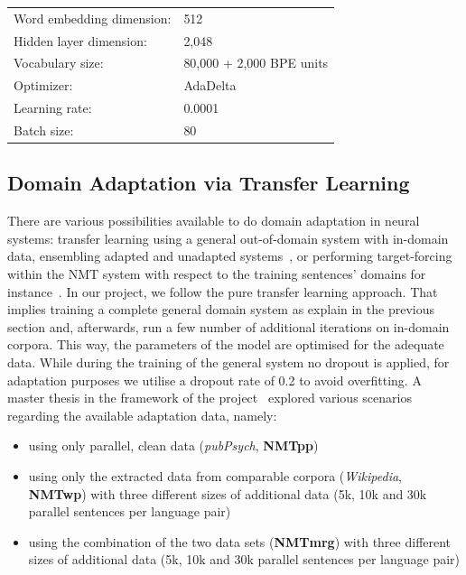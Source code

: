 \documentclass[a4paper,11pt]{article}
\begin{document}
\bigskip
\begin{tabular}{ll}
Word embedding dimension: & 512\\
Hidden layer dimension: & 2,048\\
Vocabulary size: & 80,000 + 2,000 BPE units\\
Optimizer: & AdaDelta\\
Learning rate: & 0.0001\\
Batch size: & 80\\
\end{tabular}



\subsection{Domain Adaptation via Transfer Learning}
\label{ss:adptNmt}

There are various possibilities available to do domain adaptation in neural systems: transfer learning using a general out-of-domain system with in-domain data, ensembling adapted and unadapted systems~\cite{freitag2016fast}, or performing target-forcing within the NMT system with respect to the training sentences' domains for instance~\cite{Chu2017AnEC}.
In our project, we follow the pure transfer learning approach. That implies training a complete general domain system as explain in the previous section and, afterwards, run a few number of additional iterations on in-domain corpora. This way, the parameters of the model are optimised for the adequate data. While during the training of the general system no dropout is applied, for adaptation purposes we utilise a dropout rate of 0.2 to avoid overfitting. 
A master thesis in the framework of the project~\cite{tesisAdam} explored various scenarios regarding the available adaptation data, namely: 

\begin{itemize}
\itemsep0.2em
	\item\label{i:pp} using only parallel, clean data (\textit{pubPsych}, {\bf NMTpp})
	\item using only the extracted data from comparable corpora (\textit{Wikipedia}, {\bf NMTwp}) with three different sizes of additional data (5k, 10k and 30k parallel sentences per language pair)
	\item using the combination of the two data sets ({\bf NMTmrg}) with three different sizes of additional data (5k, 10k and 30k parallel sentences per language pair)
\end{itemize}
\end{document}
